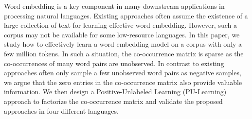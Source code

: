 Word embedding is a key component in many downstream applications in processing natural languages. Existing approaches often assume the existence of a large collection of text for learning effective word embedding. However, such a corpus may not be available for some low-resource languages. In this paper, we study how to effectively learn a word embedding model on a corpus with only a few million tokens. In such a situation, the co-occurrence matrix is sparse as the co-occurrences of many word pairs are unobserved. In contrast to existing approaches often only sample a few unobserved word pairs as negative samples, we argue that the zero entries in the co-occurrence matrix also provide valuable information. We then design a Positive-Unlabeled Learning (PU-Learning) approach to factorize the co-occurrence matrix and validate the proposed approaches in four different languages.
